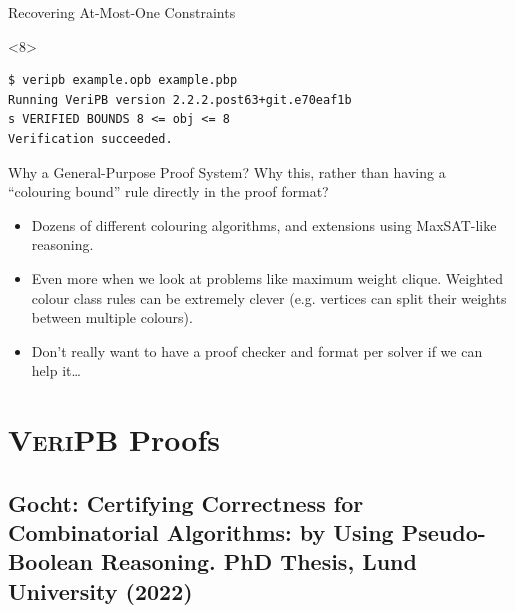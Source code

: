 \documentclass[aspectratio=169,compress,10pt]{beamer}
\makeatletter
\newcommand{\proofsystemformat}[1]{\textsc{#1}\@}
\newcommand{\veripb}{\proofsystemformat{VeriPB}\xspace}
\makeatother
\begin{document}
\begin{frame}[fragile]{Recovering At-Most-One Constraints}
\begin{onlyenv}
%
\end{onlyenv}\begin{onlyenv}<8>
\begin{Verbatim}
$ veripb example.opb example.pbp
Running VeriPB version 2.2.2.post63+git.e70eaf1b
s VERIFIED BOUNDS 8 <= obj <= 8
Verification succeeded.
\end{Verbatim}
\end{onlyenv}
\end{frame}

\begin{frame}{Why a General-Purpose Proof System?}
    Why this, rather than having a ``colouring bound'' rule directly in the proof format?
    \begin{itemize}
        \item Dozens of different colouring algorithms, and extensions using MaxSAT-like reasoning.
        \item Even more when we look at problems like maximum weight clique.
            Weighted colour class rules can be extremely clever (e.g. vertices can split their weights
            between multiple colours).
        \item Don't really want to have a proof checker and format per solver if we can help it\ldots
    \end{itemize}
\end{frame}

\section{\veripb Proofs}

\subsection{Gocht: Certifying Correctness for Combinatorial Algorithms: by Using Pseudo-Boolean
Reasoning. PhD Thesis, Lund University (2022)}
\end{document}
